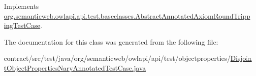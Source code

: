 Implements \hyperlink{classorg_1_1semanticweb_1_1owlapi_1_1api_1_1test_1_1baseclasses_1_1_abstract_annotated_axiom_round_tripping_test_case_a6afbb12cdaa7995823a6bb2a3a60ba8c}{org.\-semanticweb.\-owlapi.\-api.\-test.\-baseclasses.\-Abstract\-Annotated\-Axiom\-Round\-Tripping\-Test\-Case}.



The documentation for this class was generated from the following file\-:\begin{DoxyCompactItemize}
\item 
contract/src/test/java/org/semanticweb/owlapi/api/test/objectproperties/\hyperlink{_disjoint_object_properties_nary_annotated_test_case_8java}{Disjoint\-Object\-Properties\-Nary\-Annotated\-Test\-Case.\-java}\end{DoxyCompactItemize}
